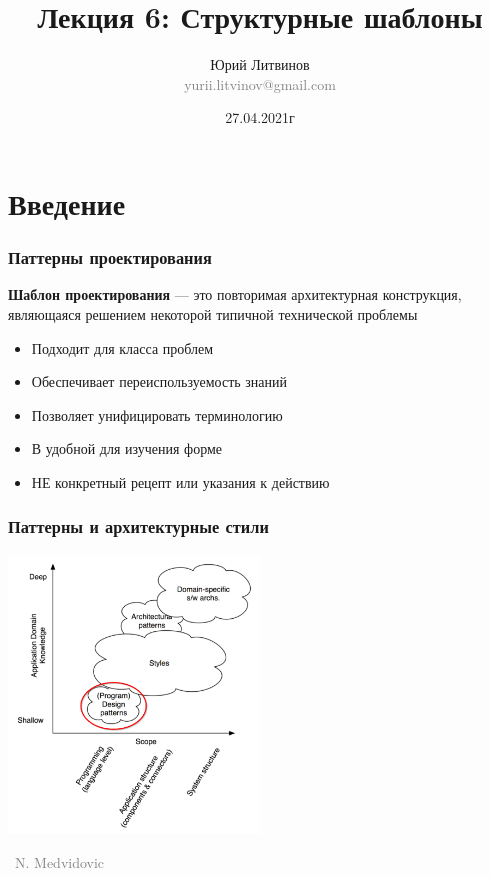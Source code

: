 \documentclass[xetex,mathserif,serif]{beamer}
\title[Структурные шаблоны]{Лекция 6: Структурные шаблоны}
\author[Юрий Литвинов]{Юрий Литвинов\\\small{\textcolor{gray}{yurii.litvinov@gmail.com}}}
\date{27.04.2021г}
\newcommand{\attribution}[1] {
    \vspace{-5mm}\begin{flushright}\begin{scriptsize}\textcolor{gray}{\textcopyright\, #1}\end{scriptsize}\end{flushright}
}
\begin{document}
    \frame{\titlepage}

    \section{Введение}

    \begin{frame}
        \frametitle{Паттерны проектирования}
        \textbf{Шаблон проектирования} --- это повторимая архитектурная конструкция, являющаяся решением некоторой типичной технической проблемы
        \begin{itemize}
            \item Подходит для класса проблем
            \item Обеспечивает переиспользуемость знаний
            \item Позволяет унифицировать терминологию
            \item В удобной для изучения форме
            \item НЕ конкретный рецепт или указания к действию
        \end{itemize}
    \end{frame}

    \begin{frame}
        \frametitle{Паттерны и архитектурные стили}
        \begin{center}
            \includegraphics[width=0.5\textwidth]{architecturalStylesPatternsHighlighted.png}
            \attribution{N. Medvidovic}
        \end{center}
    \end{frame}
\end{document}
